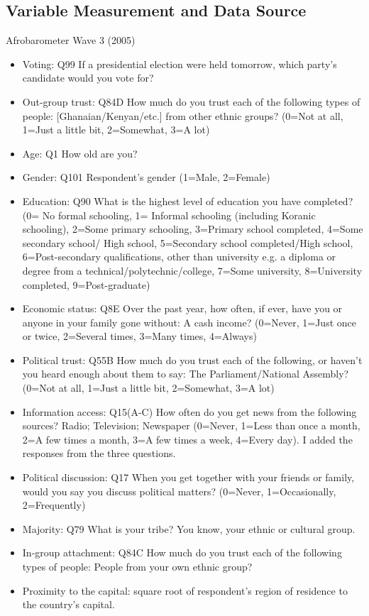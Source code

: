 \documentclass[a4paper, 12pt]{article}
\begin{document}
\subsection{Variable Measurement and Data Source}
Afrobarometer Wave 3 (2005) 
\begin{itemize}
	\item Voting: Q99 If a presidential election were held tomorrow, which party's candidate would you vote for?
	\item Out-group trust: Q84D How much do you trust each of the following types of people: [Ghanaian/Kenyan/etc.] from other ethnic groups? (0=Not at all, 1=Just a little bit, 2=Somewhat, 3=A lot)
	\item Age: Q1 How old are you? 
	\item Gender: Q101 Respondent's gender (1=Male, 2=Female)
	\item Education: Q90 What is the highest level of education you have completed? (0= No formal schooling, 1= Informal schooling (including Koranic schooling), 2=Some primary schooling, 3=Primary school completed, 4=Some secondary school/ High school, 5=Secondary school completed/High school, 6=Post-secondary qualifications, other than university e.g. a diploma or degree from a technical/polytechnic/college, 7=Some university, 8=University completed, 9=Post-graduate)
	\item Economic status: Q8E Over the past year, how often, if ever, have you or anyone in your family gone without: A cash income? (0=Never, 1=Just once or twice, 2=Several times, 3=Many times, 4=Always)
	\item Political trust: Q55B How much do you trust each of the following, or haven't you heard enough about them to say: The Parliament/National Assembly? (0=Not at all, 1=Just a little bit, 2=Somewhat, 3=A lot)
	\item Information access: Q15(A-C) How often do you get news from the following sources? Radio; Television; Newspaper (0=Never, 1=Less than once a month, 2=A few times a month, 3=A few times a week, 4=Every day). I added the responses from the three questions. 
	\item Political discussion: Q17 When you get together with your friends or family, would you say you discuss political matters? (0=Never, 1=Occasionally, 2=Frequently)
	\item Majority: Q79 What is your tribe? You know, your ethnic or cultural group. 
	\item In-group attachment: Q84C How much do you trust each of the following types of people: People from your own ethnic group? 
	\item Proximity to the capital: square root of respondent's region of residence to the country's capital.  
\end{itemize}
\end{document}
